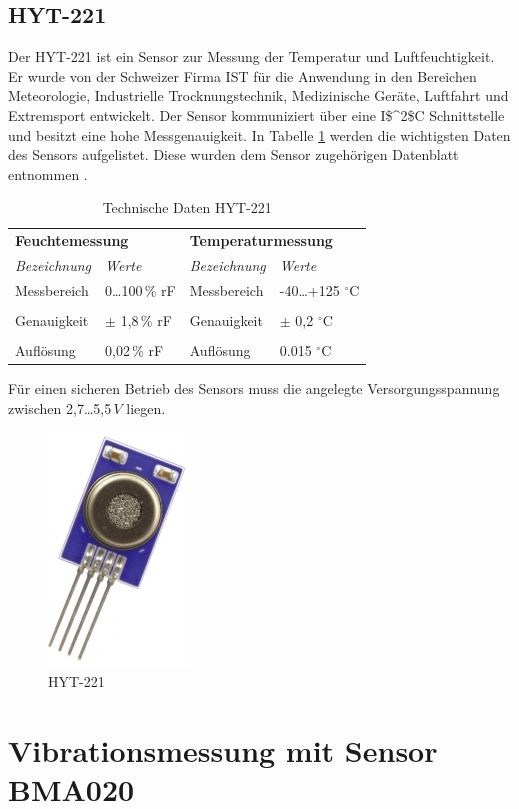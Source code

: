 \subsection{HYT-221}
\label{subsection_HYT221}
Der HYT-221 ist ein Sensor zur Messung der Temperatur und Luftfeuchtigkeit. Er wurde von der Schweizer Firma \ac{IST} für die Anwendung in den Bereichen Meteorologie, Industrielle Trocknungstechnik, Medizinische Geräte, Luftfahrt und Extremsport entwickelt. Der Sensor kommuniziert über eine \ac{I$^2$C} Schnittstelle und besitzt eine hohe Messgenauigkeit. In Tabelle \ref{Tabelle_Technische_Daten_HYT221}  werden die wichtigsten Daten des Sensors aufgelistet. Diese wurden dem Sensor zugehörigen Datenblatt entnommen \citep{Datenblatt_HYT221}.

\begin{table}[H]
\centering
\begin{tabular}{
llll
}
\toprule
\multicolumn{2}{p{7cm}}{\centering\textbf{Feuchtemessung}} & \multicolumn{2}{p{7cm}}{\centering\textbf{Temperaturmessung} } \\
\multicolumn{1}{p{4cm}}{\textit{Bezeichnung}} & \multicolumn{1}{p{3cm}}{\centering\textit{Werte} }&\multicolumn{1}{p{4cm}}{\textit{Bezeichnung}} & \multicolumn{1}{p{3cm}}{\centering\textit{Werte} }\\\midrule
Messbereich & 0\dots 100\,\% rF & Messbereich  & -40\dots +125 $^\circ\text{C}$ \\
&&&\\
Genauigkeit & $\pm$ 1,8\,\% rF& Genauigkeit & $\pm$ 0,2 $^\circ\text{C}$\\
&&&\\
Auflösung & 0,02\,\% rF & Auflösung & 0.015 $^\circ\text{C}$\\
\bottomrule
\end{tabular}
\caption{Technische Daten HYT-221 \citep{Datenblatt_HYT221}}
\label{Tabelle_Technische_Daten_HYT221}
\end{table}

Für einen sicheren Betrieb des Sensors muss die angelegte Versorgungsspannung zwischen 2,7\dots 5,5\,$V$ liegen.

\begin{figure}[!h] 
  \centering
     \includegraphics[scale=.8]{BilderAllgemein/HYT221.png}
  \caption{HYT-221 \citep{Bild_HYT221}}
  \label{Abb_HYT221}
\end{figure}




\section{Vibrationsmessung mit Sensor BMA020}
\label{section_BMA020}